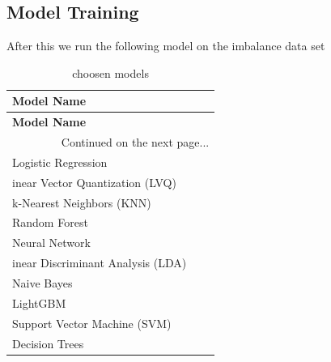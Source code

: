 \documentclass[12pt,a4paper]{article}
\begin{document}
\subsection{Model Training}
After this we run the following model on the imbalance data set 
\begin{longtable}{lll}
	\caption{choosen models} \\
	\toprule
	\textbf{Model Name} \\ 
	\midrule
	\endfirsthead
	
	\toprule
	\textbf{Model Name} \\ 
	\midrule
	\endhead
	
	\midrule
	\multicolumn{3}{r}{Continued on the next page...} \\
	\midrule
	\endfoot
	
	\bottomrule
	\endlastfoot
	
	Logistic Regression \\
	inear Vector Quantization (LVQ) \\
	k-Nearest Neighbors (KNN) \\
	Random Forest \\
	Neural Network \\
	inear Discriminant Analysis (LDA) \\
	Naive Bayes \\
	LightGBM \\
	Support Vector Machine (SVM) \\
	Decision Trees \\
	
	
\end{longtable}
\end{document}
